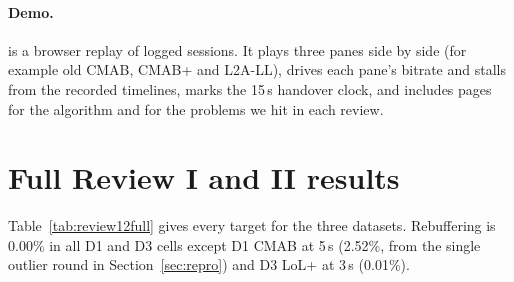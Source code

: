\documentclass[sigconf]{acmart}
\newcommand{\cmabp}{CMAB+\xspace}
\newcommand{\oldcmab}{old CMAB\xspace}
\begin{document}
\paragraph{Demo.}  is a browser replay of logged sessions. It plays three panes side by side (for example \oldcmab, \cmabp and L2A-LL), drives each pane's bitrate and stalls from the recorded timelines, marks the 15\,s handover clock, and includes pages for the algorithm and for the problems we hit in each review.

\section{Full Review I and II results}
\label{app:review12}

Table~\ref{tab:review12full} gives every target for the three datasets. Rebuffering is 0.00\% in all D1 and D3 cells except D1 CMAB at 5\,s (2.52\%, from the single outlier round in Section~\ref{sec:repro}) and D3 LoL+ at 3\,s (0.01\%).
\end{document}
